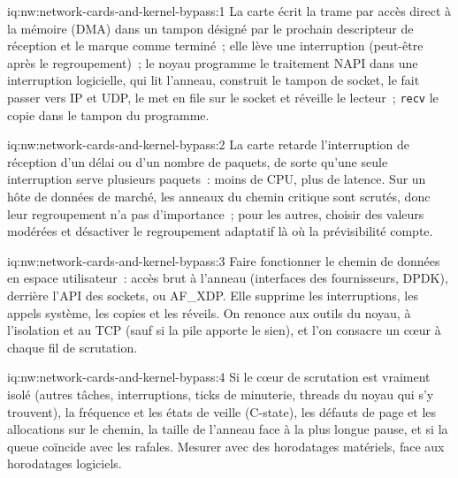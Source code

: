 \begin{solution}{iq:nw:network-cards-and-kernel-bypass:1}
La carte écrit la trame par accès direct à la mémoire (DMA) dans un tampon désigné par le prochain descripteur de réception et le marque comme terminé~; elle lève une interruption (peut-être
après le regroupement)~; le noyau programme le traitement NAPI dans une interruption logicielle, qui lit l'anneau, construit le tampon de socket, le fait passer
vers IP et UDP, le met en file sur le socket et réveille le lecteur~; \texttt{recv} le copie dans le tampon du programme.
\end{solution}

\begin{solution}{iq:nw:network-cards-and-kernel-bypass:2}
La carte retarde l'interruption de réception d'un délai ou d'un nombre de paquets, de sorte qu'une seule interruption serve plusieurs paquets~: moins de CPU, plus de latence.
Sur un hôte de données de marché, les anneaux du chemin critique sont scrutés, donc leur regroupement n'a pas d'importance~; pour les autres, choisir des valeurs modérées et
désactiver le regroupement adaptatif là où la prévisibilité compte.
\end{solution}

\begin{solution}{iq:nw:network-cards-and-kernel-bypass:3}
Faire fonctionner le chemin de données en espace utilisateur~: accès brut à l'anneau (interfaces des fournisseurs, DPDK),  derrière l'API des sockets, ou AF\_XDP.
Elle supprime les interruptions, les appels système, les copies et les réveils. On renonce aux outils du noyau, à l'isolation et au TCP (sauf si la pile apporte
le sien), et l'on consacre un cœur à chaque fil de scrutation.
\end{solution}

\begin{solution}{iq:nw:network-cards-and-kernel-bypass:4}
Si le cœur de scrutation est vraiment isolé (autres tâches, interruptions, ticks de minuterie, threads du noyau qui s'y trouvent), la fréquence et les états de veille (C-state),
les défauts de page et les allocations sur le chemin, la taille de l'anneau face à la plus longue pause, et si la queue coïncide avec les rafales. Mesurer
avec des horodatages matériels, face aux horodatages logiciels.
\end{solution}

